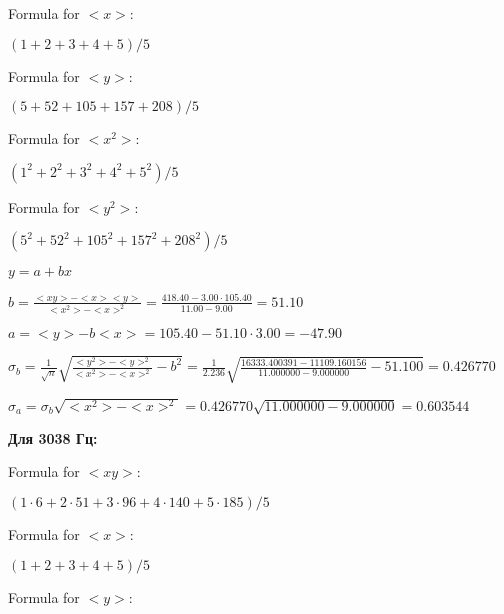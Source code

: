 \documentclass[12pt,a4paper]{article}
\begin{document}
Formula for $<x>:$
\vspace{0.5cm}

$(1 + 2 + 3 + 4 + 5) / 5$
\vspace{0.5cm}

Formula for $<y>:$
\vspace{0.5cm}

$(5 + 52 + 105 + 157 + 208) / 5$
\vspace{0.5cm}

Formula for $<x^2>$:
\vspace{0.5cm}

$(1^2 + 2^2 + 3^2 + 4^2 + 5^2) / 5$
\vspace{0.5cm}

Formula for $<y^2>:$
\vspace{0.5cm}

$(5^2 + 52^2 + 105^2 + 157^2 + 208^2) / 5$
\vspace{0.5cm}



$y = a + bx$
\vspace{0.5cm}

$b = \frac{<xy> - <x><y>}{<x^2> - <x>^2} = \frac{418.40 - 3.00 \cdot 105.40}{11.00 - 9.00} = 51.10$
\vspace{0.5cm}

$a =<y> - b<x> = 105.40 - 51.10 \cdot 3.00 = -47.90$
\vspace{0.5cm}

$\sigma_b = \frac{1}{\sqrt{n}} \sqrt { \frac{<y^2> - <y>^2}{<x^2> - <x>^2}  - b^2} = \frac{1}{2.236} \sqrt {\frac{16333.400391 - 11109.160156}{11.000000 - 9.000000} - 51.100} = 0.426770$
\vspace{0.5cm}

$\sigma_a = \sigma_b \sqrt{<x^2> - <x>^2} = 0.426770 \sqrt{11.000000 - 9.000000} = 0.603544$
\vspace{0.5cm}

\textbf{Для 3038 Гц:}
\vspace{0.5cm}

Formula for $<xy>:$
\vspace{0.5cm}

$(1 \cdot 6 + 2 \cdot 51 + 3 \cdot 96 + 4 \cdot 140 + 5 \cdot 185) / 5$
\vspace{0.5cm}

Formula for $<x>:$
\vspace{0.5cm}

$(1 + 2 + 3 + 4 + 5) / 5$
\vspace{0.5cm}

Formula for $<y>:$
\vspace{0.5cm}
\end{document}
